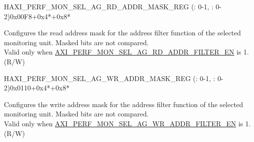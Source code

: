 \begin{register}{H}{AXI\_PERF\_MON\_SEL\_AG\_RD\_ADDR\_MASK\_REG (: 0-1, : 0-2)}{0x00F8+0x4*+0x8*}\label{regdesc:AXIPERFMONSELAGNRDADDRMASKMREG}
%
\regnewline%
\begin{regdesc}\begin{reglist}
\label{fielddesc:AXIPERFMONSELAGNRDADDRMASKM}\item [AXI\_PERF\_MON\_SEL\_AG\regindex{n}\_RD\_ADDR\_MASK\regindex{m} (\regindex{n}: 0-1, \regindex{m}: 0-2)] Configures the read address mask for the address filter function of the selected monitoring unit. Masked bits are not compared.\\
Valid only when \hyperref[fielddesc:AXIPERFMONSELAGNRDADDRFILTEREN]{AXI\_PERF\_MON\_SEL\_AG\_RD\_ADDR\_FILTER\_EN} is 1.\\
(R/W)
\end{reglist}\end{regdesc}
\end{register}


\begin{register}{H}{AXI\_PERF\_MON\_SEL\_AG\_WR\_ADDR\_MASK\_REG (: 0-1, : 0-2)}{0x0110+0x4*+0x8*}\label{regdesc:AXIPERFMONSELAGNWRADDRMASKMREG}
%
\regnewline%
\begin{regdesc}\begin{reglist}
\label{fielddesc:AXIPERFMONSELAGNWRADDRMASKM}\item [AXI\_PERF\_MON\_SEL\_AG\regindex{n}\_WR\_ADDR\_MASK\regindex{m} (\regindex{n}: 0-1, \regindex{m}: 0-2)] Configures the write address mask for the address filter function of the selected monitoring unit. Masked bits are not compared.\\
Valid only when \hyperref[fielddesc:AXIPERFMONSELAGNWRADDRFILTEREN]{AXI\_PERF\_MON\_SEL\_AG\_WR\_ADDR\_FILTER\_EN} is 1.\\
(R/W)
\end{reglist}\end{regdesc}
\end{register}


